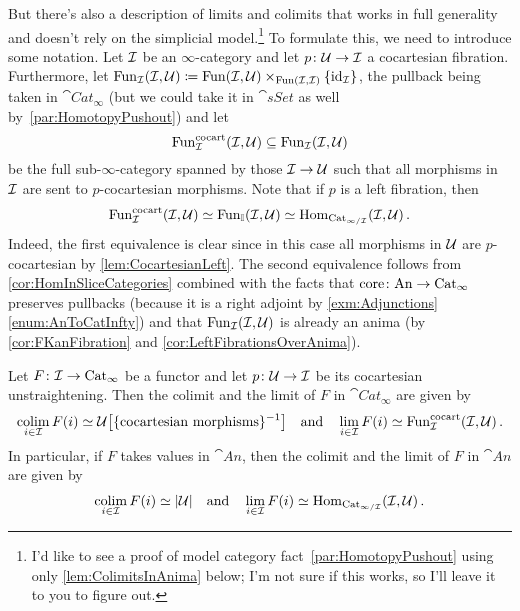 %	
%
But there's also a description of limits and colimits that works in full generality and doesn't rely on the simplicial model.\footnote{I'd like to see a proof of model category fact~\cref{par:HomotopyPushout} using only \cref{lem:ColimitsInAnima} below; I'm not sure if this works, so I'll leave it to you to figure out.} To formulate this, we need to introduce some notation. Let $\mathcal{I}$ be an $\infty$-category and let $p\colon \mathcal{U}\rightarrow \mathcal{I}$ a cocartesian fibration. Furthermore, let $\operatorname{Fun}_{\mathcal{I}}(\mathcal{I},\mathcal{U})\coloneqq \operatorname{Fun}(\mathcal{I},\mathcal{U})\times_{\operatorname{Fun}(\mathcal{I},\mathcal{I})}\{\operatorname{id}_{\mathcal{I}}\}$, the pullback being taken in $\cat{Cat}_\infty$ (but we could take it in $\cat{sSet}$ as well by~\cref{par:HomotopyPushout}) and let
\begin{equation*}
	\operatorname{Fun}_{\mathcal{I}}^{\mathrm{cocart}}(\mathcal{I},\mathcal{U})\subseteq \operatorname{Fun}_{\mathcal{I}}(\mathcal{I},\mathcal{U})
\end{equation*}
be the full sub-$\infty$-category spanned by those $\mathcal{I}\rightarrow \mathcal{U}$ such that all morphisms in $\mathcal{I}$ are sent to $p$-cocartesian morphisms. Note that if $p$ is a left fibration, then
\begin{equation*}
	\operatorname{Fun}_{\mathcal{I}}^{\mathrm{cocart}}(\mathcal{I},\mathcal{U})\simeq \operatorname{Fun}_{\mathbb{I}}(\mathcal{I},\mathcal{U})\simeq \operatorname{Hom}_{\mathrm{Cat}_{\infty/\mathcal{I}}}(\mathcal{I},\mathcal{U})\,.
\end{equation*}
Indeed, the first equivalence is clear since in this case all morphisms in $\mathcal{U}$ are $p$-cocartesian by \cref{lem:CocartesianLeft}. The second equivalence follows from \cref{cor:HomInSliceCategories} combined with the facts that $\operatorname{core}\colon \mathrm{An}\rightarrow \mathrm{Cat}_\infty$ preserves pullbacks (because it is a right adjoint by \cref{exm:Adjunctions}\cref{enum:AnToCatInfty}) and that $\operatorname{Fun}_{\mathcal{I}}(\mathcal{I},\mathcal{U})$ is already an anima (by \cref{cor:FKanFibration} and \cref{cor:LeftFibrationsOverAnima}).
\begin{lem}\label{lem:ColimitsInAnima}
	Let $F\colon \mathcal{I}\rightarrow \mathrm{Cat}_\infty$ be a functor and let $p\colon \mathcal{U}\rightarrow \mathcal{I}$ be its cocartesian unstraightening. Then the colimit and the limit of $F$ in $\cat{Cat}_\infty$ are given by
	\begin{equation*}
		\colimit_{i\in\Ii}F(i)\simeq \Uu\left[\{\text{cocartesian morphisms}\}^{-1}\right]\quad\text{and}\quad
		\limit_{i\in\Ii}F(i)\simeq \Fun_\Ii^{\mathrm{cocart}}(\Ii,\Uu)\,.
	\end{equation*}
	In particular, if $F$ takes values in $\cat{An}$, then the colimit and the limit of $F$ in $\cat{An}$ are given by
	\begin{equation*}
		\colimit_{i\in\Ii}F(i)\simeq \abs*{\Uu}\quad\text{and}\quad \limit_{i\in\Ii}F(i)\simeq \Hom_{\Cat_{\infty/\Ii}}(\Ii,\Uu)\,.
	\end{equation*}
\end{lem}
